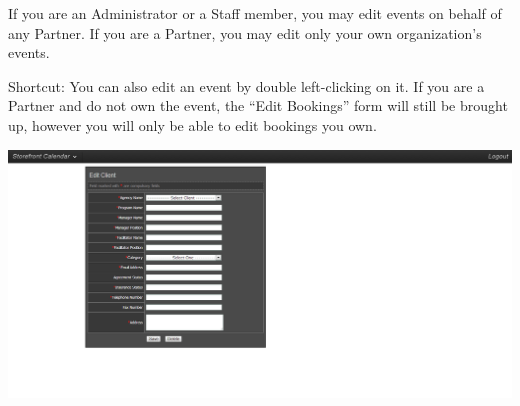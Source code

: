 If you are an Administrator or a Staff member, you may edit events on behalf of any Partner. If you are a Partner, you may edit only your own organization's events.

Shortcut: You can also edit an event by double left-clicking on it. If you are a Partner and do not own the event, the ``Edit Bookings'' form will still be brought up, however you will only be able to edit bookings you own.

\includegraphics[width=\linewidth]{screenshots/img_editevent}

